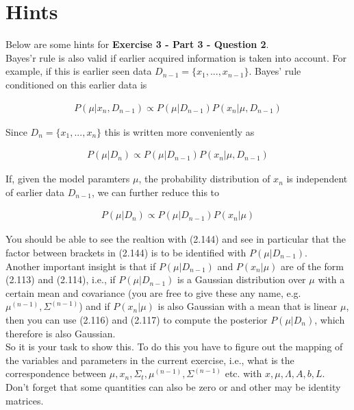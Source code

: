 \documentclass[a4paper]{article}
\begin{document}
\section*{Hints}

Below are some hints for \textbf{Exercise 3 - Part 3 - Question 2}.\\

Bayes'r rule is also valid if earlier acquired information is taken into account. For example, if this is earlier seen data $D_{n - 1} = \{ x_1,..., x_{n - 1}\}$. Bayes' rule conditioned on this earlier data is 

\begin{align*}
	P(\mu | x_n, D_{n - 1}) \propto P(\mu | D_{n - 1}) P(x_n | \mu, D_{n - 1})
\end{align*}

Since $D_n = \{ x_1, ..., x_n\}$ this is written more conveniently as 

\begin{align*}
	P(\mu | D_{n}) \propto P(\mu | D_{n - 1}) P(x_n | \mu, D_{n - 1})
\end{align*}


If, given the model paramters $\mu$, the probability distribution of $x_n$ is independent of earlier data $D_{n - 1}$, we can further reduce this to

\begin{align*}
	P(\mu | D_{n}) \propto P(\mu | D_{n - 1}) P(x_n | \mu)
\end{align*}

You should be able to see the realtion with (2.144) and see in particular that the factor between brackets in (2.144) is to be identified with $P(\mu | D_{n - 1})$.\\
Another important insight is that if $P(\mu | D_{n - 1})$ and $P(x_n | \mu)$ are of the form (2.113) and (2.114), i.e., if $P(\mu | D_{n - 1})$ is a Gaussian distribution over $\mu$ with a certain mean and covariance (you are free to give these any name, e.g. $\mu^{(n-1)}, \Sigma^{(n-1)}$) and if $P(x_n | \mu)$ is also Gaussian with a mean that is linear $\mu$, then you can use (2.116) and (2.117) to compute the posterior $P(\mu | D_n)$, which therefore is also Gaussian.\\
So it is your task to show this. To do this you have to figure out the mapping of the variables and parameters in the current exercise, i.e., what is the correspondence between $\mu, x_n, \Sigma_t, \mu^{(n-1)}, \Sigma^{(n-1)}$ etc. with $x, \mu, \Lambda, A, b, L$. Don't forget that some quantities can also be zero or and other may be identity matrices.
\end{document}
